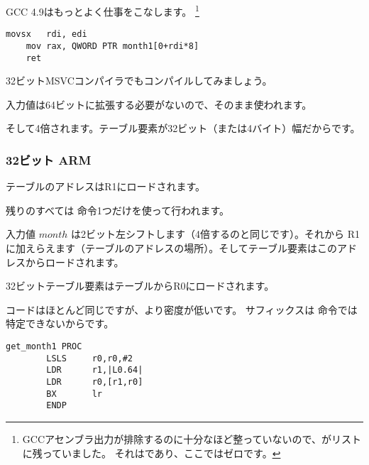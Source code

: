 \Optimizing GCC 4.9はもっとよく仕事をこなします。
\footnote{GCCアセンブラ出力が排除するのに十分なほど整っていないので、がリストに残っていました。 
それはであり、ここではゼロです。}

\begin{lstlisting}[caption=\Optimizing GCC 4.9 x64,style=customasmx86]
	movsx	rdi, edi
	mov	rax, QWORD PTR month1[0+rdi*8]
	ret
\end{lstlisting}


32ビットMSVCコンパイラでもコンパイルしてみましょう。



入力値は64ビットに拡張する必要がないので、そのまま使われます。

そして4倍されます。テーブル要素が32ビット（または4バイト）幅だからです。

\subsubsection{32ビット ARM}





テーブルのアドレスはR1にロードされます。

残りのすべては \LDR 命令1つだけを使って行われます。

入力値 $month$ は2ビット左シフトします（4倍するのと同じです）。それから
R1に加えらえます（テーブルのアドレスの場所）。そしてテーブル要素はこのアドレスからロードされます。

32ビットテーブル要素はテーブルからR0にロードされます。


コードはほとんど同じですが、より密度が低いです。 \LSL サフィックスは \LDR 命令では特定できないからです。

\begin{lstlisting}[style=customasmARM]
get_month1 PROC
        LSLS     r0,r0,#2
        LDR      r1,|L0.64|
        LDR      r0,[r1,r0]
        BX       lr
        ENDP
\end{lstlisting}

